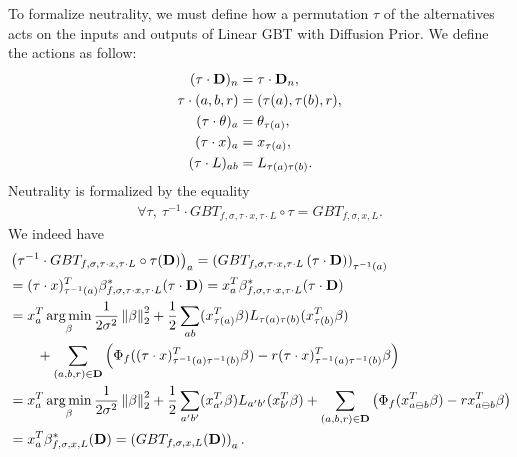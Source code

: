 \documentclass{article}
\newcommand{\mathsep}{,~}
\newcommand{\norm}[2]{\left\lVert{#1}\right\rVert_{#2}}
\DeclareMathOperator*{\argmin}{arg\,min}
\newcommand{\bD}{{\bf D}}
\newcommand{\ab}{a\ominus{} b}
\begin{document}
To formalize neutrality, 
we must define how a permutation $\tau$ of the alternatives 
acts on the inputs and outputs of Linear GBT with Diffusion Prior.
We define the actions as follow:
\begin{align}
    (\tau \cdot \bD)_n &= \tau \cdot \bD_n, \\
    \tau \cdot (a, b, r) &= (\tau(a), \tau(b), r), \\
    (\tau \cdot \theta)_a &= \theta_{\tau(a)}, \\
    (\tau \cdot x)_a &= x_{\tau(a)}, \\
    (\tau \cdot L)_{ab} &= L_{\tau(a) \tau(b)}.
\end{align}
Neutrality is formalized by the equality
\begin{align}
    \forall \tau \mathsep \tau^{-1} 
        \cdot GBT_{f, \sigma, \tau \cdot x, \tau \cdot L} 
        \circ \tau 
    = GBT_{f, \sigma, x, L}.
\end{align}
We indeed have
\begin{align}
    &\left( \tau^{-1} \cdot GBT_{f, \sigma, \tau \cdot x, \tau \cdot L} \circ \tau (\bD) \right)_a
    = \left( GBT_{f, \sigma, \tau \cdot x, \tau \cdot L} \left( \tau \cdot \bD \right) \right)_{\tau^{-1}(a)} \\
    &= (\tau \cdot x)^T_{\tau^{-1}(a)} \beta_{f, \sigma, \tau \cdot x, \tau \cdot L}^*(\tau \cdot \bD)
    = x_a^T \beta_{f, \sigma, \tau \cdot x, \tau \cdot L}^*(\tau \cdot \bD) \\
    &= x^T_a \argmin_{\beta} 
        \frac{1}{2 \sigma^2} \norm{\beta}{2}^2
        + \frac{1}{2} \sum_{ab} (x^T_{\tau(a)} \beta) L_{\tau(a) \tau(b)} (x^T_{\tau(b)} \beta) \nonumber \\
        &\qquad 
        + \sum_{(a, b, r) \in \bD} \left(
            \Phi_f((\tau \cdot x)_{\tau^{-1}(a) \tau^{-1}(b)}^T \beta)
            - r (\tau \cdot x)_{\tau^{-1}(a) \tau^{-1}(b)}^T \beta
        \right) \\
    &= x^T_a \argmin_{\beta} 
        \frac{1}{2 \sigma^2} \norm{\beta}{2}^2
        + \frac{1}{2} \sum_{a'b'} (x^T_{a'} \beta) L_{a' b'} (x^T_{b'} \beta) 
        + \sum_{(a, b, r) \in \bD} \left(
            \Phi_f(x_{\ab}^T \beta)
            - r x_{\ab}^T \beta
        \right) \\
    &= x_a^T \beta_{f, \sigma, x, L}^*(\bD)
    = \left( GBT_{f, \sigma, x, L} (\bD) \right)_a.
\end{align}
\end{document}
